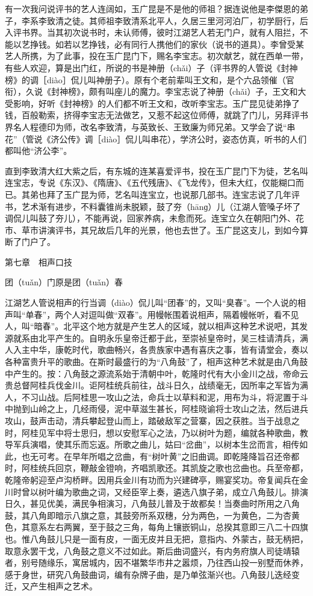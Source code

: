 \documentclass[12pt,UTF8]{ctexbook}
\begin{document}
有一次我问说评书的艺人连阔如，玉广昆是不是他的师祖？据连说他是李傑恩的弟子，李系李致清之徒。其师祖李致清系北平人，久居三里河河泊厂，初学厨行，后入评书界。当其初次说书时，未认师傅，彼时江湖艺人若无门户，就有人阻拦，不能以艺挣钱。如若以艺挣钱，必有同行人携他们的家伙（说书的道具）。李曾受某艺人所携，为了此事，投在玉广昆门下，赐名李宝志。初次献艺，就在西单一带，有些人欢迎，算是出门红，所说的书是神册（chǎi）子（评书界的人管说《封神榜》的调［diào］侃儿叫神册子）。原有个老前辈叫王文和，是个六品领催（官衔），久说《封神榜》，颇有叫座儿的魔力。李宝志说了神册（chǎi）子，王文和大受影响，好听《封神榜》的人们都不听王文和，改听李宝志。玉广昆见徒弟挣了钱，百般勒索，挤得李宝志无法做艺，又惹不起这位师傅，就跳了门儿，另拜评书界名人程德印为师，改名李致清，与英致长、王致廉为师兄弟。又学会了说“串花”（管说《济公传》调［diào］侃儿叫串花），学济公时，姿态仿真，听书的人们都叫他“济公李”。

直到李致清大红大紫之后，有东城的连某喜爱评书，投在玉广昆门下为徒，艺名叫连宝志，专说《东汉》、《隋唐》、《五代残唐》、《飞龙传》，但未大红，仅能糊口而已。其弟也拜了玉广昆为师，艺名叫连宝立，也说那几部书。连宝志说了几年评书，艺术渐有进步，不料囊锥尚未脱颖，鼓了夯（hānɡ）儿（江湖人管嗓子坏了调侃儿叫鼓了夯儿），不能再说，回家养病，未愈而死。连宝立久在朝阳门外、花市、草市讲演评书，其兄故后几年的光景，他也去世了。玉广昆这支儿，到如今算断了门户了。





第七章　相声口技


团（tuǎn）门原是团（tuǎn）春


江湖艺人管说相声的行当调（diào）侃儿叫“团春”的，又叫“臭春”。一个人说的相声叫“单春”，两个人对逗叫做“双春”。用幔帐围着说相声，隔着幔帐听，看不见人，叫“暗春”。北平这个地方就是产生艺人的区域，就以相声这种艺术说吧，其发源就系由北平产生的。自明永乐皇帝迁都于此，至崇祯皇帝时，吴三桂请清兵，满人入主中华，康乾时代，歌曲畅兴，各贵族家中遇有喜庆之事，皆有请堂会，奏以各种富贵升平的歌曲。在斯时最盛行的为“八角鼓”了，相声这种艺术就是由八角鼓中产生的。按：八角鼓之源流系始于清朝中叶，乾隆时代有大小金川之战，帝命云贵总督阿桂兵伐金川。讵阿桂统兵前往，战斗日久，战绩毫无，因所率之军皆为满人，不习山战。后阿桂思一攻山之法，命兵士以草料和泥，用布为斗，将泥置于斗中抛到山岭之上，几经雨侵，泥中草滋生甚长，阿桂晓谕将士攻山之法，然后进兵攻山，鼓声击动，清兵攀起登山而上，踏破敌军之营寨，因之获胜。当于战息之时，阿桂见军中将士思归，想以安慰军心之法，乃以树叶为题，编就各种歌曲，教导军兵演唱，使其乐而忘返。所歌之曲儿，姑曰“岔曲”，以树本生岔而言，相传如此，也无可考。在早年所唱之岔曲，有“树叶黄”之旧曲调。即乾隆降旨召还帝都时，阿桂统兵回京，鞭敲金镫响，齐唱凯歌还。其凯旋之歌也岔曲也。兵至帝都，乾隆帝躬迎至卢沟桥畔。因用兵金川有功而为兴建碑亭，赐宴奖功。帝复闻兵在金川时曾以树叶编为歌曲之词，又经臣宰上奏，遴选八旗子弟，成立八角鼓儿。排演日久，甚见优美，满民争相演习，八角鼓儿普及于故都矣！当奏曲时所用之八角鼓，其八角即暗示八旗之意，其鼓旁所系双穗，分为两色，一为黄色，二为杏黄色，其意系左右两翼，至于鼓之三角，每角上镶嵌铜山，总揆其意即三八二十四旗也。惟八角鼓儿只是一面有皮，一面无皮并且无把，意指内、外蒙古，鼓无柄把，取意永罢干戈，八角鼓之意义不过如此。斯后曲词盛兴，有内务府旗人司徒靖辕者，别号随缘乐，寓居城内，因不堪繁华市井之嚣烦，乃往西山投一别墅而休养，感于身世，研究八角鼓曲词，编有杂牌子曲，是乃单弦渐兴也。八角鼓儿迭经变迁，又产生相声之艺术。
\end{document}
